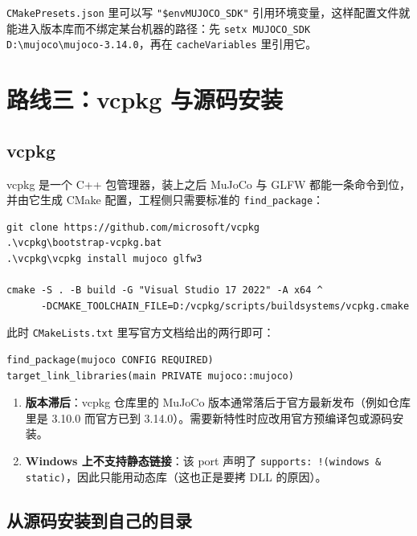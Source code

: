 \begin{tipbox}[把路径交给环境变量]
	\texttt{CMakePresets.json} 里可以写 \texttt{"\$env{MUJOCO\_SDK}"} 引用环境变量，这样配置文件就能进入版本库而不绑定某台机器的路径：先 \texttt{setx MUJOCO\_SDK D:\textbackslash{}mujoco\textbackslash{}mujoco-3.14.0}，再在 \texttt{cacheVariables} 里引用它。
\end{tipbox}

\section{路线三：vcpkg 与源码安装}

\subsection{vcpkg}

vcpkg 是一个 C++ 包管理器，装上之后 MuJoCo 与 GLFW 都能一条命令到位，并由它生成 CMake 配置，工程侧只需要标准的 \texttt{find\_package}：

\begin{lstlisting}[style=shell]
git clone https://github.com/microsoft/vcpkg
.\vcpkg\bootstrap-vcpkg.bat
.\vcpkg\vcpkg install mujoco glfw3

cmake -S . -B build -G "Visual Studio 17 2022" -A x64 ^
      -DCMAKE_TOOLCHAIN_FILE=D:/vcpkg/scripts/buildsystems/vcpkg.cmake
\end{lstlisting}

此时 \texttt{CMakeLists.txt} 里写官方文档给出的两行即可：

\begin{lstlisting}[style=cmake]
find_package(mujoco CONFIG REQUIRED)
target_link_libraries(main PRIVATE mujoco::mujoco)
\end{lstlisting}

\begin{warnbox}
	\begin{enumerate}
		\item \textbf{版本滞后}：vcpkg 仓库里的 MuJoCo 版本通常落后于官方最新发布（例如仓库里是 3.10.0 而官方已到 3.14.0）。需要新特性时应改用官方预编译包或源码安装。
		\item \textbf{Windows 上不支持静态链接}：该 port 声明了 \texttt{supports: !(windows \& static)}，因此只能用动态库（这也正是要拷 DLL 的原因）。
	\end{enumerate}
\end{warnbox}

\subsection{从源码安装到自己的目录}

